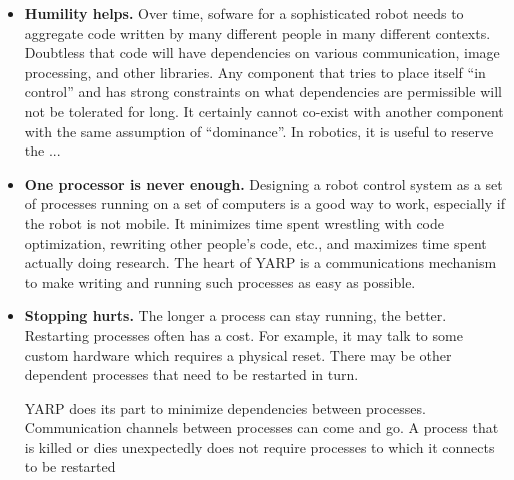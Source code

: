 \begin{itemize} \pflist

\item {\bf Humility helps.}
%
Over time, sofware for a sophisticated robot needs to 
aggregate code written by many different people in many
different contexts.  Doubtless that code will have
dependencies on various communication, image processing,
and other libraries.
%
Any component that tries to place itself ``in control'' and has strong
constraints on what dependencies are permissible will not be tolerated
for long.  It certainly cannot co-exist with another component
with the same assumption of ``dominance''.  In robotics, it is useful to
reserve the ...


\item {\bf One processor is never enough.}
%
Designing a robot control system as a set of processes running on
  a set of computers is a good way to work, especially if the robot
  is not mobile.  It minimizes time spent wrestling with code
  optimization, rewriting other people's code, etc., and maximizes
  time spent actually doing research.
  The heart of YARP is a communications mechanism to make writing
  and running such processes as easy as possible.


\item {\bf Stopping hurts.}
%
The longer a process can stay running, the better.  Restarting
  processes often has a cost.  For example, it may talk to some
  custom hardware which requires a physical reset.  There may
  be other dependent processes that need to be restarted in turn.

  YARP does its part to minimize dependencies between processes.
  Communication channels between processes can come and go.
  A process that is killed or dies unexpectedly does not
  require processes to which it connects to be restarted



\end{itemize}

